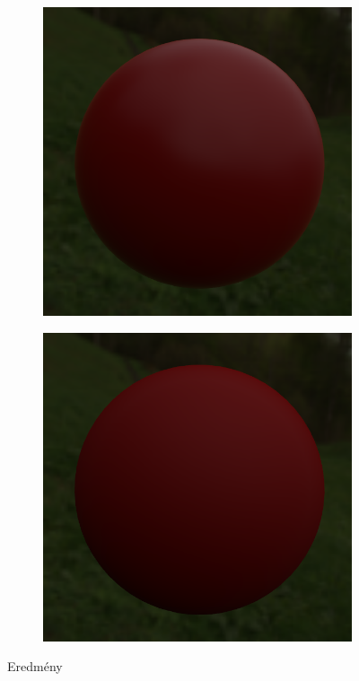 \begin{figure}[!ht]
\begin{subfigure}[b]{0.28\textwidth}
        \includegraphics[width=\textwidth]{images/scr_r05.png}
    \end{subfigure}
    \hfill
    \begin{subfigure}[b]{0.28\textwidth}
        \centering
        \includegraphics[width=\textwidth]{images/scr_r0.png}
    \end{subfigure}
    \caption{Eredmény}
\end{figure}

